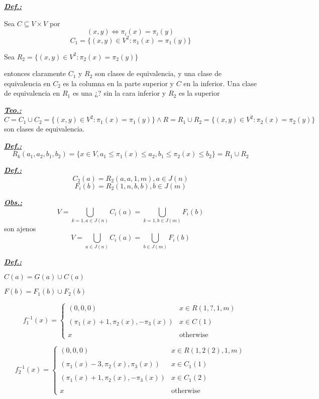 \documentclass[a4paper, 10pt]{article}
\begin{document}
	\textbf{\textit{\underline{Def.:}}}
	
	Sea $ C\subseteq V\times V $ por 
	$$ (x,y)\iff \pi_i(x)=\pi_i(y) $$
	$$ C_1=\{ (x,y)\in V^2: \pi_1(x)=\pi_1(y) \} $$ 
	
	Sea $ R_2=\{ (x,y)\in V^2: \pi_2(x)=\pi_2(y) \} $
	
	entonces claramente $ C_1 $ y $ R_2 $ son clases de equivalencia, y una clase de equivalencia en $ C_2 $ es la columna en la parte superior y $ C $ en la inferior.
	Una clase de equivalencia en $ R_1 $ es una ¿? sin la cara inferior y $ R_2 $ es la superior
	
	\textbf{\textit{\underline{Teo.:}}}
	$$ C=C_1\cup C_2=\{(x,y)\in V^2:\pi_1(x)=\pi_1(y) \} \wedge R=R_1\cup R_2=\{(x,y)\in V^2: \pi_2(x)=\pi_2(y)\} $$ 
	son clases de equivalencia.
	
	\textbf{\textit{\underline{Def.:}}}
	$$ R_k(a_1,a_2,b_1,b_2)=\{ x\in V, a_1\leqslant \pi_1(x)\leqslant a_2, b_1\leqslant \pi_2(x)\leqslant b_2 \}=R_1\cup R_2 $$
	
	
	\textbf{\textit{\underline{Def.:}}}
	$$ C_2(a)=R_2(a,a,1,m), a\in J(n) $$
	$$ F_i(b)=R_2(1,n,b,b), b\in J(m) $$
	
	\textbf{\textit{\underline{Obs.:}}}
	$$ V=\bigcup_{k=1, a\in J(n)} C_i(a) =\bigcup_{k=1, b\in J(m)} F_i(b) $$
	son ajenos
	$$ V=\bigcup_{a\in J(n)} C_i(a) =\bigcup_{b\in J(m)} F_i(b) $$
	
	\textbf{\textit{\underline{Def.:}}}
	
	$ C(a)=G(a)\cup C(a) $
	
	$ F(b)=F_1(b)\cup F_2(b) $
	
	$$f_1^{-1}(x)=\left \{ \begin{array}{ll}
		(0,0,0) & x\in R(1,?,1,m)\\
		\\
		(\pi_1(x)+1,\pi_2(x),-\pi_3(x)) & x\in C(1)\\
		\\
		x & \mbox{otherwise}
	\end{array}  \right .$$ 

	$$f_2^{-1}(x)=\left \{ \begin{array}{ll}
		(0,0,0) & x\in R(1,2(2),1,m)\\
		\\
		(\pi_1(x)-3,\pi_2(x),\pi_3(x)) & x\in C_1(1)\\
		\\
		(\pi_1(x)+1,\pi_2(x),-\pi_3(x)) & x\in C_1(2)\\
		\\
		x & \mbox{otherwise}
	\end{array}  \right .$$
		
\end{document}
